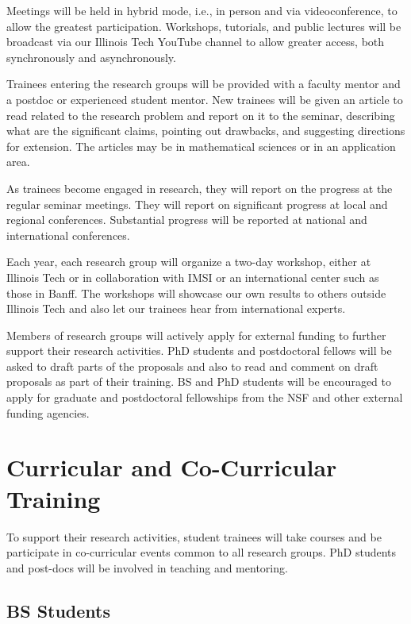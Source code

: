 \documentclass[11pt]{NSFamsart}
\begin{document}
Meetings will be held in hybrid mode, i.e., in person and via videoconference, to allow the greatest participation.  Workshops, tutorials, and public lectures will be broadcast via our Illinois Tech YouTube channel to allow greater access, both synchronously and asynchronously.

Trainees entering the research groups will be provided with a faculty mentor and a postdoc or experienced student mentor.  New trainees will be given an article to read related to the research problem and report on it to the seminar, describing what are the significant claims, pointing out drawbacks, and suggesting directions for extension. The articles may be in mathematical sciences or in an application area.

As trainees become engaged in research, they will report on the progress at the regular seminar meetings. They will report on significant progress at local and regional conferences.  Substantial progress will be reported at national and international conferences.

Each year, each research group will organize a two-day workshop, either at Illinois Tech or in collaboration with IMSI or an international center such as those in Banff.  The workshops will showcase our own results to others outside Illinois Tech and also let our trainees hear from international experts.

Members of research groups will actively apply for external funding to further support their research activities.  PhD students and postdoctoral fellows will be asked to draft parts of the proposals and also to read and comment on draft proposals as part of their training.  BS and PhD students will be encouraged to apply for graduate and postdoctoral fellowships from the NSF and other external funding agencies.

\section{Curricular and Co-Curricular Training}
To support their research activities, student trainees will take courses and be participate in co-curricular events common to all research groups.  PhD students and post-docs will be involved in teaching and mentoring. 

\subsection*{BS Students}
\end{document}
